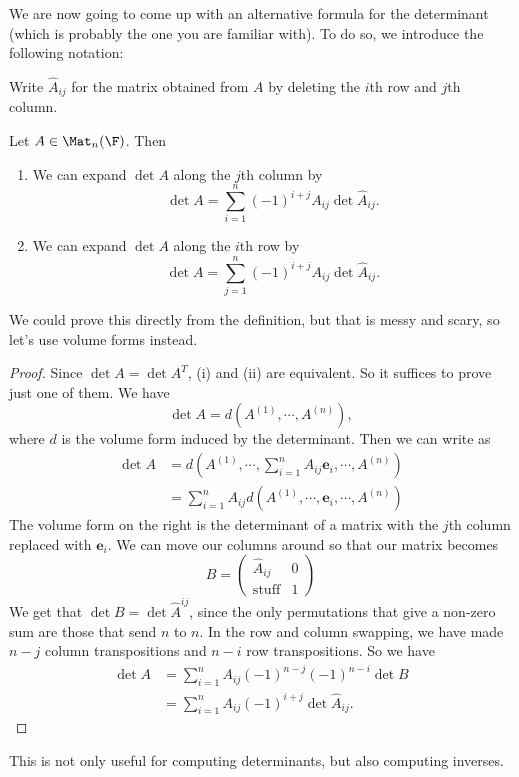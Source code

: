 \documentclass[a4paper]{article}
\begin{document}
We are now going to come up with an alternative formula for the determinant (which is probably the one you are familiar with). To do so, we introduce the following notation:
\begin{notation}
  Write $\hat{A}_{ij}$ for the matrix obtained from $A$ by deleting the $i$th row and $j$th column.
\end{notation}

\begin{lemma}
  Let $A \in \Mat_n(\F)$. Then
  \begin{enumerate}
    \item We can expand $\det A$ along the $j$th column by
      \[
        \det A = \sum_{i = 1}^n (-1)^{i + j} A_{ij} \det \hat{A}_{ij}.
      \]
    \item We can expand $\det A$ along the $i$th row by
      \[
        \det A = \sum_{j = 1}^n (-1)^{i + j} A_{ij} \det \hat{A}_{ij}.
      \]
  \end{enumerate}
\end{lemma}
We could prove this directly from the definition, but that is messy and scary, so let's use volume forms instead.

\begin{proof}
  Since $\det A = \det A^T$, (i) and (ii) are equivalent. So it suffices to prove just one of them. We have
  \[
    \det A = d(A^{(1)}, \cdots, A^{(n)}),
  \]
  where $d$ is the volume form induced by the determinant. Then we can write as
  \begin{align*}
    \det A &= d\left(A^{(1)}, \cdots, \sum_{i = 1}^n A_{ij} \mathbf{e}_i, \cdots, A^{(n)}\right)\\
    &= \sum_{i = 1}^n A_{ij} d(A^{(1)}, \cdots, \mathbf{e}_i, \cdots, A^{(n)})
  \end{align*}
  The volume form on the right is the determinant of a matrix with the $j$th column replaced with $\mathbf{e}_i$. We can move our columns around so that our matrix becomes
  \[
    B =
    \begin{pmatrix}
      \hat{A}_{ij} & 0\\
      \mathrm{stuff} & 1
    \end{pmatrix}
  \]
  We get that $\det B = \det \hat{A}^{ij}$, since the only permutations that give a non-zero sum are those that send $n$ to $n$. In the row and column swapping, we have made $n - j$ column transpositions and $n - i$ row transpositions. So we have
  \begin{align*}
    \det A &= \sum_{i = 1}^n A_{ij} (-1)^{n - j} (-1)^{n - i}\det B\\
    &= \sum_{i = 1}^n A_{ij} (-1)^{i + j} \det \hat{A}_{ij}.
  \end{align*}
\end{proof}
This is not only useful for computing determinants, but also computing inverses.
\end{document}
